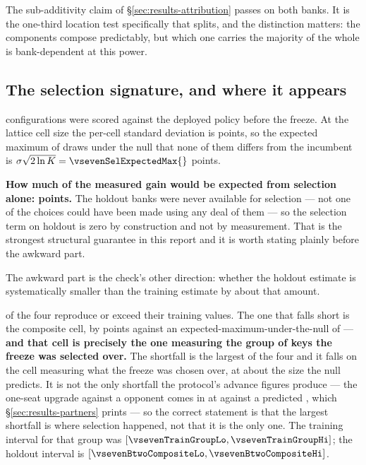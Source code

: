 The sub-additivity claim of \S\ref{sec:results-attribution} passes on both banks. It is the one-third
location test specifically that splits, and the distinction matters: the components compose
predictably, but which one carries the majority of the whole is bank-dependent at this power.

\subsection{The selection signature, and where it appears}
\label{sec:against-selection}

\vsevenSelK{} configurations were scored against the deployed policy before the freeze. At the lattice
cell size the per-cell standard deviation is \vsevenSelSigma{} points, so the expected maximum of
\vsevenSelK{} draws under the null that none of them differs from the incumbent is
$\sigma\sqrt{2\ln K} = \vsevenSelExpectedMax{}$ points.

\textbf{How much of the measured gain would be expected from selection alone: \vsevenSelOnHoldout{}
points.} The holdout banks were never available for selection --- not one of the \vsevenSelK{} choices
could have been made using any deal of them --- so the selection term on holdout is zero by
construction and not by measurement. That is the strongest structural guarantee in this report and it
is worth stating plainly before the awkward part.

The awkward part is the check's other direction: whether the holdout estimate is systematically
smaller than the training estimate by about that amount.

\begin{table}[t]\centering
\caption{Every quantity for which the protocol states a training figure in advance, against its
holdout measurement. Three reproduce or exceed; one falls short.}
\label{tab:selection}
{\small}
\end{table}

\vsevenSelReproduce{} of the four reproduce or exceed their training values. The one that falls short
is the composite cell, by \vsevenSelWorstShortfall{} points against an expected-maximum-under-the-null
of \vsevenSelExpectedMax{} --- \textbf{and that cell is precisely the one measuring the group of keys
the freeze was selected over.} The shortfall is the largest of the four and it falls on the cell measuring what the freeze was
chosen over, at about the size the null predicts. It is not the only shortfall the protocol's
advance figures produce --- the one-seat upgrade against a \vsix{} opponent comes in at
\vsevenOneSeatSix{} against a predicted \vsevenTrainOneSeatSix{}, which \S\ref{sec:results-partners}
prints --- so the correct statement is that the largest shortfall is where selection happened, not
that it is the only one. The training interval for that group was
$[\vsevenTrainGroupLo, \vsevenTrainGroupHi]$; the holdout interval is
$[\vsevenBtwoCompositeLo, \vsevenBtwoCompositeHi]$.

